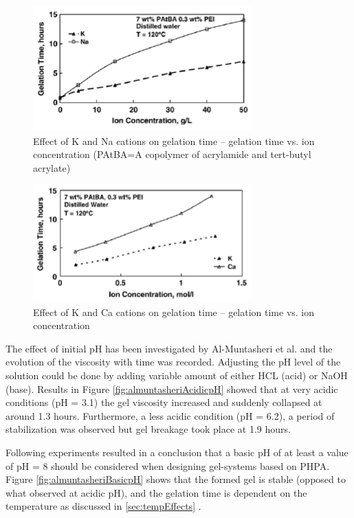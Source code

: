\begin{figure}
    \centering
    \includegraphics[width=0.75\textwidth]{img/fig/almuntasheriKNa.png}
    \caption{Effect of K and Na cations on gelation time – gelation time vs. ion concentration (PAtBA=A copolymer of acrylamide and tert-butyl acrylate) \citep{Al-Muntasheri2007}}
    \label{fig:almuntasheriKNa} %
\end{figure}

\begin{figure}
    \centering
    \includegraphics[width=0.75\textwidth]{img/fig/almuntasheriKCa.png}
    \caption{Effect of K and Ca cations on gelation time – gelation time vs. ion concentration \citep{Al-Muntasheri2007}}
    \label{fig:almuntasheriKCa} %
\end{figure}

The effect of initial  pH has been investigated by Al-Muntasheri et al. and the evolution of the viscosity with time was recorded. Adjusting the pH level of the solution could be done by adding variable amount of either HCL (acid) or NaOH (base). Results in Figure \ref{fig:almuntasheriAcidicpH} showed that at very acidic conditions (pH = 3.1) the gel viscosity increased and suddenly collapsed at around 1.3 hours. Furthermore, a less acidic condition (pH = 6.2), a period of stabilization was observed but gel breakage took place at 1.9 hours. 

Following experiments resulted in a conclusion that a basic pH of at least a value of pH = 8 should be considered when designing gel-systems based on PHPA. Figure \ref{fig:almuntasheriBasicpH} shows that the formed gel is stable (opposed to what observed at acidic pH), and the gelation time is dependent on the temperature as discussed in \ref{sec:tempEffects} \citep{Al-Muntasheri2007}.

